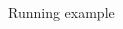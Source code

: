 \documentclass[notes,11pt, aspectratio=169]{beamer}
\begin{document}
\begin{frame}{Running example}
\begin{columns}[onlytextwidth, T]
\begin{column}{.5\textwidth}
      \end{column}%
    \end{columns}
\end{frame}
\end{document}
